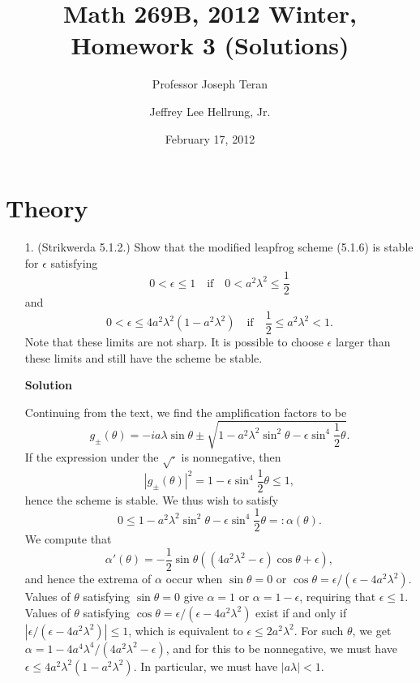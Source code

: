 \documentclass{article}
\providecommand{\abs}[1]{\left\lvert#1\right\rvert}
\begin{document}
\title{Math 269B, 2012 Winter, Homework 3 (Solutions)}
\date{February 17, 2012}
\author{Professor Joseph Teran \and Jeffrey Lee Hellrung, Jr.}
\maketitle

\section{Theory}

\begin{itemize}

\item[1.] (Strikwerda 5.1.2.) Show that the modified leapfrog scheme (5.1.6) is stable for $\epsilon$ satisfying
\begin{equation*}
0 < \epsilon \leq 1 \quad \text{if} \quad 0 < a^2 \lambda^2 \leq \frac{1}{2}
\end{equation*}
and
\begin{equation*}
0 < \epsilon \leq 4 a^2 \lambda^2 \left( 1 - a^2 \lambda^2 \right) \quad \text{if} \quad \frac{1}{2} \leq a^2 \lambda^2 < 1.
\end{equation*}
Note that these limits are not sharp. It is possible to choose $\epsilon$ larger than these limits and still have the scheme be stable.

\textbf{Solution}

Continuing from the text, we find the amplification factors to be
\begin{equation*}
g_{\pm}(\theta) = -i a \lambda \sin \theta \pm \sqrt{1 - a^2 \lambda^2 \sin^2 \theta - \epsilon \sin^4 \frac{1}{2} \theta}.
\end{equation*}
If the expression under the $\sqrt{\cdot}$ is nonnegative, then
\begin{equation*}
\abs{g_{\pm}(\theta)}^2 = 1 - \epsilon \sin^4 \frac{1}{2} \theta \leq 1,
\end{equation*}
hence the scheme is stable. We thus wish to satisfy
\begin{equation*}
0 \leq 1 - a^2 \lambda^2 \sin^2 \theta - \epsilon \sin^4 \frac{1}{2} \theta =: \alpha(\theta).
\end{equation*}
We compute that
\begin{equation*}
\alpha'(\theta) = -\frac{1}{2} \sin \theta \left( \left( 4 a^2 \lambda^2 - \epsilon \right) \cos \theta + \epsilon \right),
\end{equation*}
and hence the extrema of $\alpha$ occur when $\sin \theta = 0$ or $\cos \theta = \epsilon / \left( \epsilon - 4 a^2 \lambda^2 \right)$. Values of $\theta$ satisfying $\sin \theta = 0$ give $\alpha = 1$ or $\alpha = 1 - \epsilon$, requiring that $\epsilon \leq 1$. Values of $\theta$ satisfying $\cos \theta = \epsilon / \left( \epsilon - 4 a^2 \lambda^2 \right)$ exist if and only if $\abs{\epsilon / \left( \epsilon - 4 a^2 \lambda^2 \right)} \leq 1$, which is equivalent to $\epsilon \leq 2 a^2 \lambda^2$. For such $\theta$, we get $\alpha = 1 - 4 a^4 \lambda^4 / \left( 4 a^2 \lambda^2 - \epsilon \right)$, and for this to be nonnegative, we must have $\epsilon \leq 4 a^2 \lambda^2 \left( 1 - a^2 \lambda^2 \right)$. In particular, we must have $\abs{a \lambda} < 1$.


\end{itemize}
\end{document}

